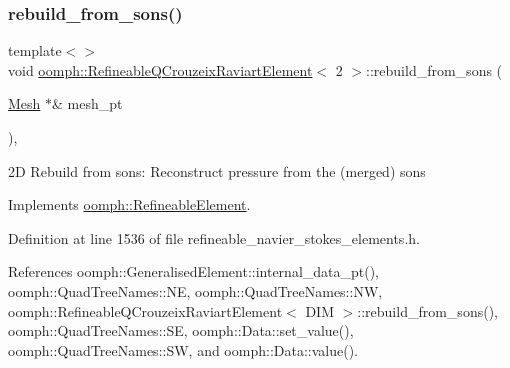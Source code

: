 \mbox{\label{classoomph_1_1RefineableQCrouzeixRaviartElement_ad5b7186fc1f963e3b48a10820b44b00b}} 
\subsubsection{\texorpdfstring{rebuild\+\_\+from\+\_\+sons()}{rebuild\_from\_sons()}\hspace{0.1cm}{\footnotesize\ttfamily [2/3]}}
{\footnotesize\ttfamily template$<$$>$ \\
void \hyperlink{classoomph_1_1RefineableQCrouzeixRaviartElement}{oomph\+::\+Refineable\+Q\+Crouzeix\+Raviart\+Element}$<$ 2 $>$\+::rebuild\+\_\+from\+\_\+sons (\begin{DoxyParamCaption}\item[{\hyperlink{classoomph_1_1Mesh}{Mesh} $\ast$\&}]{mesh\+\_\+pt }\end{DoxyParamCaption})\hspace{0.3cm}{\ttfamily [inline]}, {\ttfamily [virtual]}}



2D Rebuild from sons\+: Reconstruct pressure from the (merged) sons 



Implements \hyperlink{classoomph_1_1RefineableElement_a33324be27833fa4b78279d17158215fa}{oomph\+::\+Refineable\+Element}.



Definition at line 1536 of file refineable\+\_\+navier\+\_\+stokes\+\_\+elements.\+h.



References oomph\+::\+Generalised\+Element\+::internal\+\_\+data\+\_\+pt(), oomph\+::\+Quad\+Tree\+Names\+::\+NE, oomph\+::\+Quad\+Tree\+Names\+::\+NW, oomph\+::\+Refineable\+Q\+Crouzeix\+Raviart\+Element$<$ D\+I\+M $>$\+::rebuild\+\_\+from\+\_\+sons(), oomph\+::\+Quad\+Tree\+Names\+::\+SE, oomph\+::\+Data\+::set\+\_\+value(), oomph\+::\+Quad\+Tree\+Names\+::\+SW, and oomph\+::\+Data\+::value().

\mbox{\label{classoomph_1_1RefineableQCrouzeixRaviartElement_a55741b5c6305894bb44dd375c9f3711b}} 
